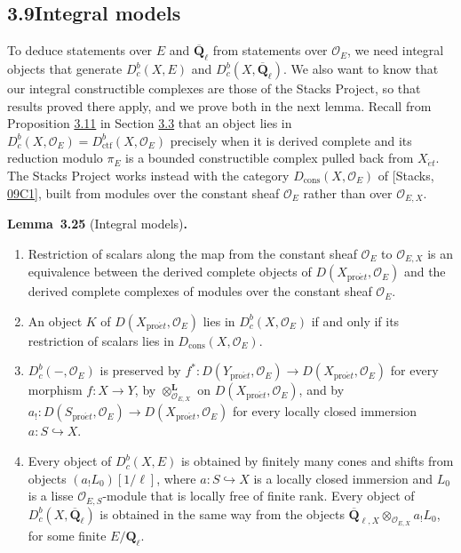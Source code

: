 \documentclass[11pt]{article}
\newenvironment{bpstatement}[2]{\par\addvspace{0.6\baselineskip}\noindent\textbf{#1}#2\textbf{.}\enspace\ignorespaces}
  {\par\addvspace{0.4\baselineskip}}
\newenvironment{bpstatementit}[2]{\begin{bpstatement}{#1}{#2}\itshape\ignorespaces}{\end{bpstatement}}
\providecommand{\Dbc}{}\renewcommand{\Dbc}{D^b_c}
\providecommand{\Dc}{}\renewcommand{\Dc}{D_{\mathrm{cons}}}
\providecommand{\QbarX}{}\renewcommand{\QbarX}{\overline{\mathbf Q}_{\ell,X}}
\begin{document}
\subsection*{\texorpdfstring{3.9\quad Integral models}{3.9 Integral models}}
\label{bp80}%
\label{bp81}%
To deduce statements over \(E\) and \(\overline{\mathbf Q}_\ell\) from statements over \(\mathcal O_E\), we need integral objects that generate \(\Dbc(X,E)\) and \(\Dbc(X,\overline{\mathbf Q}_\ell)\). We also want to know that our integral constructible complexes are those of the Stacks Project, so that results proved there apply, and we prove both in the next lemma. Recall from Proposition \hyperref[bp34]{3.11} in Section \hyperref[bp13]{3.3} that an object lies in \(\Dbc(X,\mathcal O_E)=D^b_{\mathrm{ctf}}(X,\mathcal O_E)\) precisely when it is derived complete and its reduction modulo \(\pi_E\) is a bounded constructible complex pulled back from \(X_{\acute{e}t}\). The Stacks Project works instead with the category \(\Dc(X,\mathcal O_E)\) of [Stacks, \href{https://stacks.math.columbia.edu/tag/09C1}{09C1}], built from modules over the constant sheaf \(\mathcal O_E\) rather than over \(\mathcal O_{E,X}\).

\label{bp82}%
\begin{bpstatementit}{Lemma~3.25}{ (Integral models)}
\begin{enumerate}
\item Restriction of scalars along the map from the constant sheaf \(\mathcal O_E\) to \(\mathcal O_{E,X}\) is an equivalence between the derived complete objects of \(D(X_{\mathrm{pro}\acute{e}t},\mathcal O_E)\) and the derived complete complexes of modules over the constant sheaf \(\mathcal O_E\).
\item An object \(K\) of \(D(X_{\mathrm{pro}\acute{e}t},\mathcal O_E)\) lies in \(\Dbc(X,\mathcal O_E)\) if and only if its restriction of scalars lies in \(\Dc(X,\mathcal O_E)\).
\item \(\Dbc(-,\mathcal O_E)\) is preserved by \(f^*:D(Y_{\mathrm{pro}\acute{e}t},\mathcal O_E)\to D(X_{\mathrm{pro}\acute{e}t},\mathcal O_E)\) for every morphism \(f:X\to Y\), by \(\otimes^{\mathbf L}_{\mathcal O_{E,X}}\) on \(D(X_{\mathrm{pro}\acute{e}t},\mathcal O_E)\), and by \(a_!:D(S_{\mathrm{pro}\acute{e}t},\mathcal O_E)\to D(X_{\mathrm{pro}\acute{e}t},\mathcal O_E)\) for every locally closed immersion \(a:S\hookrightarrow X\).
\item Every object of \(\Dbc(X,E)\) is obtained by finitely many cones and shifts from objects \((a_!L_0)[1/\ell]\), where \(a:S\hookrightarrow X\) is a locally closed immersion and \(L_0\) is a lisse \(\mathcal O_{E,S}\)-module that is locally free of finite rank. Every object of \(\Dbc(X,\overline{\mathbf Q}_\ell)\) is obtained in the same way from the objects \(\QbarX\otimes_{\mathcal O_{E,X}}a_!L_0\), for some finite \(E/\mathbf Q_\ell\).
\end{enumerate}
\end{bpstatementit}
\end{document}
